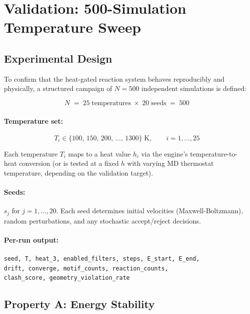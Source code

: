 \documentclass[11pt]{article}
\begin{document}
\section{Validation: 500-Simulation Temperature Sweep}

\subsection{Experimental Design}

To confirm that the heat-gated reaction system behaves reproducibly and
physically, a structured campaign of $N = 500$ independent simulations is
defined:

\begin{equation}
N \;=\; 25 \;\text{temperatures} \;\times\; 20 \;\text{seeds}
\;=\; 500
\end{equation}

\paragraph{Temperature set:}
\begin{equation}
T_i \in \{100,\,150,\,200,\,\ldots,\,1300\}\;\text{K},
\qquad i = 1,\ldots,25
\end{equation}

Each temperature $T_i$ maps to a heat value $h_i$ via the engine's
temperature-to-heat conversion (or is tested at a fixed $h$ with varying
MD thermostat temperature, depending on the validation target).

\paragraph{Seeds:} $s_j$ for $j = 1,\ldots,20$.  Each seed determines
initial velocities (Maxwell-Boltzmann), random perturbations, and any
stochastic accept/reject decisions.

\paragraph{Per-run output:}
\begin{lstlisting}[language={}]
seed, T, heat_3, enabled_filters, steps, E_start, E_end,
drift, converge, motif_counts, reaction_counts,
clash_score, geometry_violation_rate
\end{lstlisting}

\subsection{Property A: Energy Stability}
\end{document}
